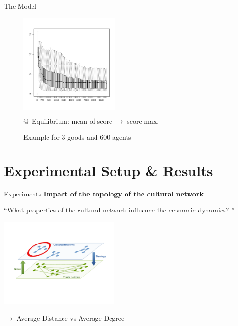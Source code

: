 \documentclass[12pt, notes=show]{beamer}
\begin{document}
	\begin{frame}{The Model }
		\begin{figure}
			\caption{Example for 3 goods and 600 agents}
			\begin{columns}
				\includegraphics[width=5cm]{images/full.pdf} 
			\end{columns}
			@~Equilibrium: mean of score  $\rightarrow$ score max.
		\end{figure}

	\end{frame}

	\section{Experimental Setup \& Results}
	\begin{frame}{Experiments}
		\textbf{Impact of the topology of the cultural network }
		\begin{center}
			``What properties of the cultural network influence the economic dynamics? '' 
		\end{center}
		\begin{center}
		\includegraphics[trim={2cm 6cm 2cm 5cm},clip,width=6cm]{images//trade-cultural2.png}
		\end{center}
		\vfil
		$\rightarrow$ Average Distance vs Average Degree\\




	\end{frame}
\end{document}
